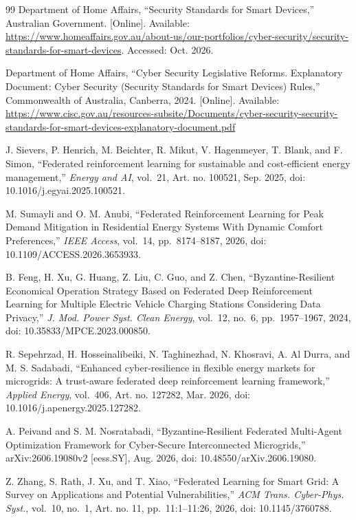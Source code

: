 \documentclass[11pt,a4paper]{article}
\begin{document}
\begin{thebibliography}{99}
 Department of Home Affairs, ``Security Standards for Smart Devices,'' Australian Government. [Online]. Available: \url{https://www.homeaffairs.gov.au/about-us/our-portfolios/cyber-security/security-standards-for-smart-devices}. Accessed: Oct. 2026.

 Department of Home Affairs, ``Cyber Security Legislative Reforms. Explanatory Document: Cyber Security (Security Standards for Smart Devices) Rules,'' Commonwealth of Australia, Canberra, 2024. [Online]. Available: \url{https://www.cisc.gov.au/resources-subsite/Documents/cyber-security-security-standards-for-smart-devices-explanatory-document.pdf}

 J. Sievers, P. Henrich, M. Beichter, R. Mikut, V. Hagenmeyer, T. Blank, and F. Simon, ``Federated reinforcement learning for sustainable and cost-efficient energy management,'' \emph{Energy and AI}, vol.~21, Art. no. 100521, Sep. 2025, doi: 10.1016/j.egyai.2025.100521.

 M. Sumayli and O. M. Anubi, ``Federated Reinforcement Learning for Peak Demand Mitigation in Residential Energy Systems With Dynamic Comfort Preferences,'' \emph{IEEE Access}, vol.~14, pp.~8174--8187, 2026, doi: 10.1109/ACCESS.2026.3653933.

 B. Feng, H. Xu, G. Huang, Z. Liu, C. Guo, and Z. Chen, ``Byzantine-Resilient Economical Operation Strategy Based on Federated Deep Reinforcement Learning for Multiple Electric Vehicle Charging Stations Considering Data Privacy,'' \emph{J. Mod. Power Syst. Clean Energy}, vol.~12, no.~6, pp.~1957--1967, 2024, doi: 10.35833/MPCE.2023.000850.

 R. Sepehrzad, H. Hosseinalibeiki, N. Taghinezhad, N. Khosravi, A. Al Durra, and M. S. Sadabadi, ``Enhanced cyber-resilience in flexible energy markets for microgrids: A trust-aware federated deep reinforcement learning framework,'' \emph{Applied Energy}, vol.~406, Art. no. 127282, Mar. 2026, doi: 10.1016/j.apenergy.2025.127282.

 A. Peivand and S. M. Nosratabadi, ``Byzantine-Resilient Federated Multi-Agent Optimization Framework for Cyber-Secure Interconnected Microgrids,'' arXiv:2606.19080v2 [eess.SY], Aug. 2026, doi: 10.48550/arXiv.2606.19080.

 Z. Zhang, S. Rath, J. Xu, and T. Xiao, ``Federated Learning for Smart Grid: A Survey on Applications and Potential Vulnerabilities,'' \emph{ACM Trans. Cyber-Phys. Syst.}, vol.~10, no.~1, Art. no. 11, pp.~11:1--11:26, 2026, doi: 10.1145/3760788.


\end{thebibliography}
\end{document}
